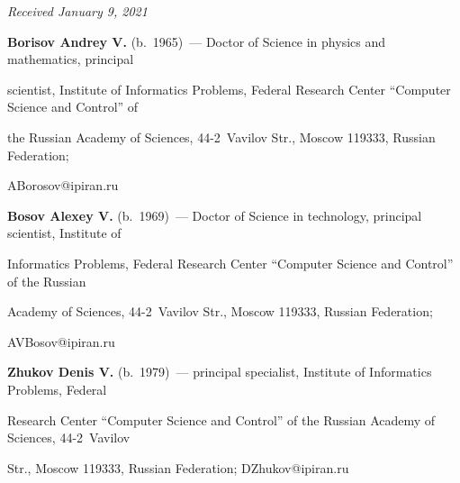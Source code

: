 




\hfill{\small\textit{Received January 9, 2021}} 










\Contr





\noindent


\textbf{Borisov Andrey V.} (b.\ 1965)~--- Doctor of Science in physics and mathematics, principal 


scientist, Institute of Informatics Problems, Federal Research Center ``Computer Science and Control'' of 


the Russian Academy of Sciences, 44-2~Vavilov Str., Moscow 119333, Russian Federation; 


\mbox{ABorosov@ipiran.ru}





\vspace*{3pt}





\noindent


\textbf{Bosov Alexey V.} (b.\ 1969)~--- Doctor of Science in technology, principal scientist, Institute of 


Informatics Problems, Federal Research Center ``Computer Science and Control'' of the Russian 


Academy of Sciences, 44-2~Vavilov Str., Moscow 119333, Russian Federation; 


\mbox{AVBosov@ipiran.ru}





\vspace*{3pt}





\noindent


\textbf{Zhukov Denis V.} (b.\ 1979)~--- principal specialist, Institute of Informatics Problems, Federal 


Research Center ``Computer Science and Control'' of the Russian Academy of Sciences, 44-2~Vavilov 


Str., Moscow 119333, Russian Federation; \mbox{DZhukov@ipiran.ru}





